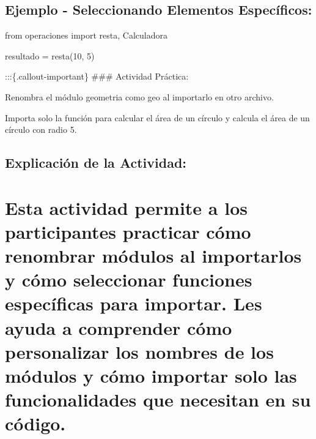 \documentclass[
  a4paper,
  DIV=11,
  numbers=noendperiod,
  onepage,
  openany]{scrreprt}
\newenvironment{Shaded}{\begin{snugshade}}{\end{snugshade}}
\newcommand{\DecValTok}[1]{\textcolor[rgb]{0.68,0.00,0.00}{#1}}
\newcommand{\ImportTok}[1]{\textcolor[rgb]{0.00,0.46,0.62}{#1}}
\newcommand{\NormalTok}[1]{\textcolor[rgb]{0.00,0.23,0.31}{#1}}
\newcommand{\OperatorTok}[1]{\textcolor[rgb]{0.37,0.37,0.37}{#1}}
\begin{document}
\hypertarget{ejemplo---seleccionando-elementos-especuxedficos}{%
\section{Ejemplo - Seleccionando Elementos
Específicos:}\label{ejemplo---seleccionando-elementos-especuxedficos}}

\begin{Shaded}
\begin{Highlighting}[]
\ImportTok{from}\NormalTok{ operaciones }\ImportTok{import}\NormalTok{ resta, Calculadora}

\NormalTok{resultado }\OperatorTok{=}\NormalTok{ resta(}\DecValTok{10}\NormalTok{, }\DecValTok{5}\NormalTok{)}
\end{Highlighting}
\end{Shaded}

:::\{.callout-important\} \#\#\# Actividad Práctica:

Renombra el módulo geometria como geo al importarlo en otro archivo.

Importa solo la función para calcular el área de un círculo y calcula el
área de un círculo con radio 5.

\hypertarget{explicaciuxf3n-de-la-actividad-60}{%
\section{Explicación de la
Actividad:}\label{explicaciuxf3n-de-la-actividad-60}}

\hypertarget{esta-actividad-permite-a-los-participantes-practicar-cuxf3mo-renombrar-muxf3dulos-al-importarlos-y-cuxf3mo-seleccionar-funciones-especuxedficas-para-importar.-les-ayuda-a-comprender-cuxf3mo-personalizar-los-nombres-de-los-muxf3dulos-y-cuxf3mo-importar-solo-las-funcionalidades-que-necesitan-en-su-cuxf3digo.}{%
\chapter{Esta actividad permite a los participantes practicar cómo
renombrar módulos al importarlos y cómo seleccionar funciones
específicas para importar. Les ayuda a comprender cómo personalizar los
nombres de los módulos y cómo importar solo las funcionalidades que
necesitan en su
código.}\label{esta-actividad-permite-a-los-participantes-practicar-cuxf3mo-renombrar-muxf3dulos-al-importarlos-y-cuxf3mo-seleccionar-funciones-especuxedficas-para-importar.-les-ayuda-a-comprender-cuxf3mo-personalizar-los-nombres-de-los-muxf3dulos-y-cuxf3mo-importar-solo-las-funcionalidades-que-necesitan-en-su-cuxf3digo.}}
\end{document}
